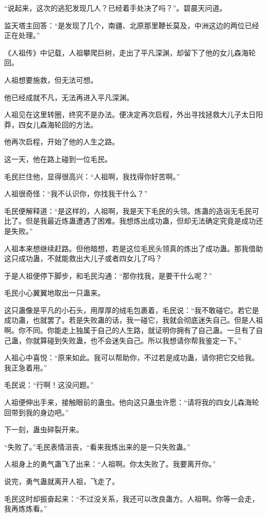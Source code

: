 \begin{this_body}
“说起来，这次的逃犯发现几人？已经着手处决了吗？”。碧晨天问道。

监天塔主回答：“是发现了几个，南疆、北原那里鞭长莫及，中洲这边的两位已经正在处理。”

《人祖传》中记载，人祖攀爬巨树，走出了平凡深渊，却留下了他的女儿森海轮回。

人祖想要施救，但无法可想。

他已经成就不凡，无法再进入平凡深渊。

人祖见在这里转圈，终究不是办法。便决定再次启程，外出寻找拯救大儿子太日阳莽，四女儿森海轮回的方法。

他再次启程，开始了他的人生之路。

这一天，他在路上碰到一位毛民。

毛民拦住他，显得很高兴：“人祖啊，我找得你好苦啊。”

人祖很奇怪：“我不认识你，你找我干什么？”

毛民便解释道：“是这样的，人祖啊，我是天下毛民的头领。炼蛊的造诣无毛民可比了。但是我最近炼蛊遭遇了困难。我想炼出成功蛊，但却无法确定究竟是成功还是失败。”

人祖本来想继续赶路。但他暗想，若是这位毛民头领真的炼出了成功蛊。那我借助这只成功蛊，不就能救出大儿子或者四女儿了吗？

于是人祖便停下脚步，和毛民沟通：“那你找我，是要干什么呢？”

毛民小心翼翼地取出一只蛊来。

这只蛊像是平凡的小石头，用厚厚的绒毛包裹着，毛民说：“我不敢碰它。若它是成功蛊，也就罢了。若是失败蛊的话，我一碰它，我就会彻底迷失自己。但是人祖啊。你不同。你能走上独属于自己的人生路，就证明你拥有了自己蛊。一旦有了自己蛊，你就算碰到失败蛊，也不会迷失自己。所以我想请你帮我鉴定一下。”

人祖心中喜悦：“原来如此。我可以帮助你，不过若是成功蛊，请你把它交给我。我正急着用。”

毛民说：“行啊！这没问题。”

人祖便伸出手来，接触眼前的蛊虫。他向这只蛊虫许愿：“请将我的四女儿森海轮回带到我的身边吧。”

下一刻，蛊虫碎裂开来。

“失败了。”毛民表情沮丧，“看来我炼出来的是一只失败蛊。”

人祖身上的勇气蛊飞了出来：“人祖啊。你太失败了。我要离开你。”

说完，勇气蛊就离开人祖，飞走了。

毛民这时却振奋起来：“不过没关系，我还可以改良蛊方。人祖啊。你等一会走，我再炼炼看。”


\end{this_body}
